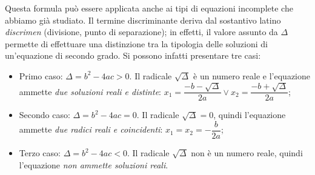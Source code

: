 Questa formula può essere applicata anche ai tipi di equazioni incomplete che abbiamo già studiato. Il termine discriminante deriva dal sostantivo latino \emph{discrimen} (divisione, punto di separazione); in effetti, il valore assunto da $\Delta$ permette di effettuare una distinzione tra la tipologia delle soluzioni di un'equazione di secondo grado.
Si possono infatti presentare tre casi:
\begin{itemize}
\item Primo caso: $\Delta=b^{2} - 4 a c > 0$. Il radicale $\sqrt{\Delta}$ è un numero reale e l'equazione ammette \emph{due soluzioni reali e
distinte}: $x_{1}=\dfrac{- b - \sqrt{\Delta}}{2 a} \vee x_{2} = \dfrac{- b + \sqrt{\Delta}}{2 a}$;
\item Secondo caso: $\Delta=b^{2} - 4 a c=0$. Il radicale $\sqrt{\Delta} = 0$, quindi l'equazione ammette \emph{due radici reali e coincidenti}: $x_{1}=x_{2}=- \dfrac{b}{2 a}$;
\item Terzo caso: $\Delta=b^{2} - 4 a c < 0$. Il radicale $\sqrt{\Delta}$ non è un numero reale, quindi l'equazione \emph{non ammette soluzioni reali}.
\end{itemize}

